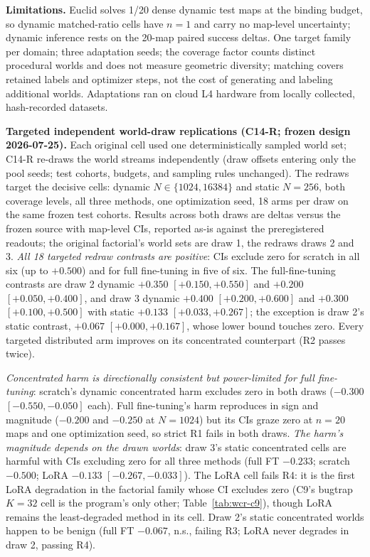 \documentclass[letterpaper]{article} %
\newcommand{\stage}[1]{\textsc{#1}}
\begin{document}
\textbf{Limitations.} Euclid solves 1/20 dense dynamic test maps at the binding budget, so dynamic matched-ratio cells have $n{=}1$ and carry no map-level uncertainty; dynamic inference rests on the 20-map paired success deltas. One target family per domain; three adaptation seeds; the coverage factor counts distinct procedural worlds and does not measure geometric diversity; matching covers retained labels and optimizer steps, not the cost of generating and labeling additional worlds. Adaptations ran on cloud L4 hardware from locally collected, hash-recorded datasets.

\textbf{Targeted independent world-draw replications (C14-R; frozen design 2026-07-25).} Each original cell used one deterministically sampled world set; C14-R re-draws the world streams independently (draw offsets entering only the pool seeds; test cohorts, budgets, and sampling rules unchanged). The redraws target the decisive cells: dynamic $N \in \{1024, 16384\}$ and static $N{=}256$, both coverage levels, all three methods, one optimization seed, 18 arms per draw on the same frozen test cohorts. Results across both draws are deltas versus the frozen source with map-level CIs, reported as-is against the preregistered readouts; the original factorial's world sets are draw 1, the redraws draws 2 and 3. \emph{All 18 targeted redraw contrasts are positive}: CIs exclude zero for scratch in all six (up to $+0.500$) and for full fine-tuning in five of six. The full-fine-tuning contrasts are draw 2 dynamic $+0.350$ $[+0.150,+0.550]$ and $+0.200$ $[+0.050,+0.400]$, and draw 3 dynamic $+0.400$ $[+0.200,+0.600]$ and $+0.300$ $[+0.100,+0.500]$ with static $+0.133$ $[+0.033,+0.267]$; the exception is draw 2's static contrast, $+0.067$ $[+0.000,+0.167]$, whose lower bound touches zero. Every targeted distributed arm improves on its concentrated counterpart (R2 passes twice).

\emph{Concentrated harm is directionally consistent but power-limited for full fine-tuning}: scratch's dynamic concentrated harm excludes zero in both draws ($-0.300$ $[-0.550,-0.050]$ each). Full fine-tuning's harm reproduces in sign and magnitude ($-0.200$ and $-0.250$ at $N{=}1024$) but its CIs graze zero at $n{=}20$ maps and one optimization seed, so strict R1 fails in both draws. \emph{The harm's magnitude depends on the drawn worlds}: draw 3's static concentrated cells are harmful with CIs excluding zero for all three methods (full FT $-0.233$; scratch $-0.500$; LoRA $-0.133$ $[-0.267,-0.033]$). The LoRA cell fails R4: it is the first LoRA degradation in the factorial family whose CI excludes zero (\stage{C9}'s bugtrap $K{=}32$ cell is the program's only other; Table~\ref{tab:wcr-c9}), though LoRA remains the least-degraded method in its cell. Draw 2's static concentrated worlds happen to be benign (full FT $-0.067$, n.s., failing R3; LoRA never degrades in draw 2, passing R4).
\end{document}
